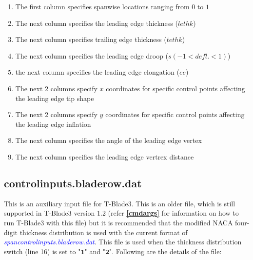 \documentclass[8pt]{article}
\begin{document}
\begin{itemize}[leftmargin=*]
\begin{enumerate}[label=\alph*]
        \item The first column specifies spanwise locations ranging from $0$ to $1$
        \item The next column specifies the leading edge thickness ($lethk$)
        \item The next column specifies trailing edge thickness ($tethk$)
        \item The next column specifies the leading edge droop ($s(-1<defl.<1)$)
        \item the next column specifies the leading edge elongation ($ee$)
        \item The next 2 columns specify $x$ coordinates for specific control points affecting the leading edge tip shape
        \item The next 2 columns specify $y$ coordinates for specific control points affecting the leading edge inflation
        \item The next column specifies the angle of the leading edge vertex 
        \item The next column specifies the leading edge vertrex distance
    \end{enumerate}
\end{itemize}

\subsection{controlinputs.bladerow.dat}\label{auxinput2}
\noindent
This is an auxiliary input file for T-Blade3. This is an older file, which is still supported in T-Blade3 version 1.2 (refer \textbf{\ref{cmdargs}} for information on how to run T-Blade3 with this file) but it is recommended that the modified NACA four-digit thickness distribution is used with the current format of \textit{\textcolor{blue}{spancontrolinputs.bladerow.dat}}. This file is used when the thickness distribution switch (line 16) is set to "$\mathbf{1}$" and "$\mathbf{2}$". Following are the details of the file:
\end{document}
